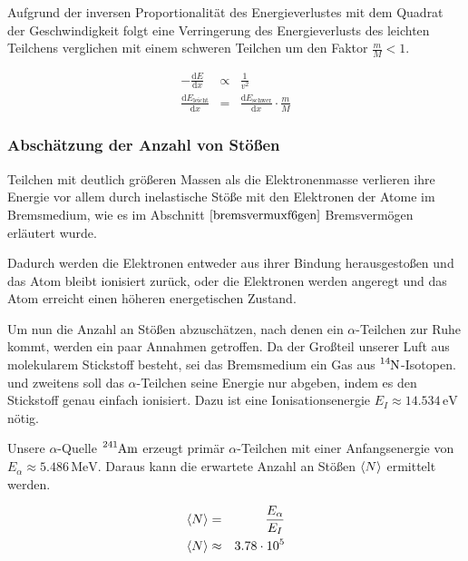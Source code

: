\documentclass[12pt,a4paper]{scrartcl}
\numberwithin{equation}{section} %
\begin{document}
Aufgrund der inversen Proportionalität des Energieverlustes mit dem Quadrat der Geschwindigkeit folgt eine Verringerung des Energieverlusts des leichten Teilchens verglichen mit einem schweren Teilchen um den Faktor $\frac{m}{M} < 1$. \cite{Demtröder}

\begin{eqnarray}
    - \frac{\mathrm dE}{\mathrm dx} &\propto& \frac{1}{v^2} \\
    \frac{\mathrm dE_\mathrm{leicht}}{\mathrm dx}
        &=& \frac{\mathrm dE_\mathrm{schwer}}{\mathrm dx}
            \cdot \frac{m}{M}
\end{eqnarray}

\hypertarget{abschuxe4tzung-der-anzahl-von-stuxf6uxdfen}{%
\subsubsection{Abschätzung der Anzahl von
Stößen}\label{abschuxe4tzung-der-anzahl-von-stuxf6uxdfen}}

Teilchen mit deutlich größeren Massen als die Elektronenmasse verlieren ihre Energie vor allem durch inelastische Stöße mit den Elektronen der Atome im Bremsmedium, wie es im Abschnitt $\ref{bremsvermuxf6gen}$ Bremsvermögen erläutert wurde.

Dadurch werden die Elektronen entweder aus ihrer Bindung herausgestoßen und das Atom bleibt ionisiert zurück, oder die Elektronen werden angeregt und das Atom erreicht einen höheren energetischen Zustand.

Um nun die Anzahl an Stößen abzuschätzen, nach denen ein $\alpha$-Teilchen zur Ruhe kommt, werden ein paar Annahmen getroffen. Da der Großteil unserer Luft aus molekularem Stickstoff besteht, sei das Bremsmedium ein Gas aus $\ce{^{14}N}$-Isotopen. und zweitens soll das $\alpha$-Teilchen seine Energie nur abgeben, indem es den Stickstoff genau einfach ionisiert. Dazu ist eine Ionisationsenergie $E_I\approx 14.534 \mathrm{\,eV}$ nötig. \cite{Ionization Energy}

Unsere $\alpha$-Quelle $\ce{^{241}Am}$ erzeugt primär $\alpha$-Teilchen mit einer Anfangsenergie von $E_\alpha\approx 5.486 \mathrm{\,MeV}$. Daraus kann die erwartete Anzahl an Stößen $\expval{N}$ ermittelt werden.

\begin{eqnarray}
    \expval{N} &=& \frac{E_\alpha}{E_I} \\
    \expval{N} &\approx& 3.78 \cdot 10^5
\end{eqnarray}
\end{document}
